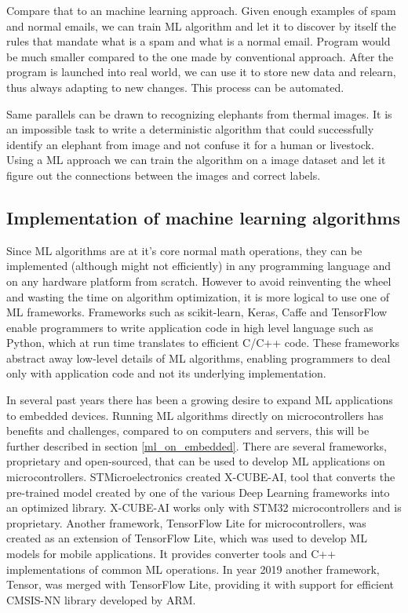 Compare that to an machine learning approach. 
Given enough examples of spam and normal emails, we can train ML algorithm and let it to discover by itself the rules that mandate what is a spam and what is a normal email.
Program would be much smaller compared to the one made by conventional approach. 
After the program is launched into real world, we can use it to store new data and relearn, thus always adapting to new changes.
This process can be automated.

Same parallels can be drawn to recognizing elephants from thermal images.
It is an impossible task to write a deterministic algorithm that could successfully identify an elephant from image and not confuse it for a human or livestock. 
Using a ML approach we can train the algorithm on a image dataset and let it figure out the connections between the images and correct labels. 


\subsection{ Implementation of machine learning algorithms}

Since ML algorithms are at it's core normal math operations, they can be implemented (although might not efficiently) in any programming language and on any hardware platform from scratch.
However to avoid reinventing the wheel and wasting the time on algorithm optimization, it is more logical to use one of ML frameworks.
Frameworks such as scikit-learn, Keras, Caffe and TensorFlow enable programmers to write application code in high level language such as Python, which at run time translates to efficient C/C++ code. 
These frameworks abstract away low-level details of ML algorithms, enabling programmers to deal only with application code and not its underlying implementation.

In several past years there has been a growing desire to expand ML applications to embedded devices.
Running ML algorithms directly on microcontrollers has benefits and challenges, compared to on computers and servers, this will be further described in section \ref{ml_on_embedded}.
There are several frameworks, proprietary and open-sourced, that can be used to develop ML applications on microcontrollers.
STMicroelectronics created X-CUBE-AI, tool that converts the pre-trained model created by one of the various Deep Learning frameworks into an optimized library. 
X-CUBE-AI works only with STM32 microcontrollers and is proprietary.
Another framework, TensorFlow Lite for microcontrollers, was created as an extension of TensorFlow Lite, which was used to develop ML models for mobile applications.
It provides converter tools and C++ implementations of common ML operations.
In year 2019 another framework, \si{\micro}Tensor, was merged with TensorFlow Lite, providing it with support for efficient CMSIS-NN library developed by ARM.

